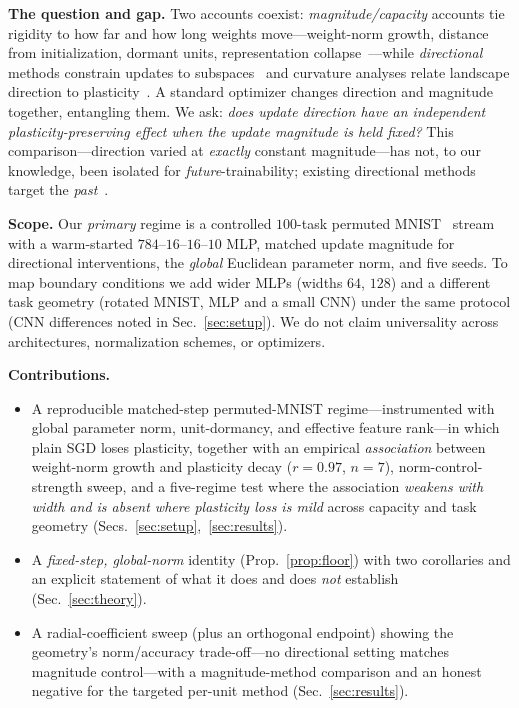 \documentclass[conference]{IEEEtran}
\begin{document}
\textbf{The question and gap.} Two accounts coexist: \emph{magnitude/capacity}
accounts tie rigidity to how far and how long weights move---weight-norm growth,
distance from initialization, dormant units, representation
collapse~\cite{ash2020,sokar2023,lyle2022,berariu2021,springer2025}---while
\emph{directional} methods constrain updates to
subspaces~\cite{lopezpaz2017,farajtabar2020,saha2021gpm,zeng2019owm,chaudhry2020orthog}
and curvature analyses relate landscape direction to
plasticity~\cite{lewandowski2023}. A standard optimizer changes direction and
magnitude together, entangling them. We ask: \emph{does update direction have an
independent plasticity-preserving effect when the update magnitude is held
fixed?} This comparison---direction varied at \emph{exactly} constant
magnitude---has not, to our knowledge, been isolated for \emph{future}-trainability;
existing directional methods target the \emph{past}~\cite{farajtabar2020,saha2021gpm}.

\textbf{Scope.} Our \emph{primary} regime is a controlled $100$-task permuted
MNIST~\cite{lecun1998} stream with a warm-started $784$--$16$--$16$--$10$ MLP,
matched update magnitude for directional interventions, the \emph{global}
Euclidean parameter norm, and five seeds. To map boundary conditions we add wider
MLPs (widths $64$, $128$) and a different task geometry (rotated MNIST, MLP and a
small CNN) {under the same protocol (CNN differences noted in Sec.~\ref{sec:setup})}. We do not claim
universality across architectures, normalization schemes, or optimizers.

\noindent\textbf{Contributions.}
\begin{itemize}
\item A reproducible matched-step permuted-MNIST regime---instrumented with global
parameter norm, unit-dormancy, and effective feature rank---in which plain SGD
loses plasticity, together with an empirical \emph{association} between
weight-norm growth and plasticity decay ($r{=}0.97$, $n{=}7$),
norm-control-strength sweep, and a five-regime test where the association
\emph{weakens with width and {is absent where plasticity loss is mild}} across
capacity and task geometry
(Secs.~\ref{sec:setup},~\ref{sec:results}).
\item A \emph{fixed-step, global-norm} {identity} (Prop.~\ref{prop:floor}) with two
corollaries and an explicit statement of what it does and does \emph{not}
establish
(Sec.~\ref{sec:theory}).
\item A radial-coefficient sweep (plus an orthogonal endpoint) showing the
geometry's norm/accuracy trade-off---no directional setting matches magnitude
control---with a magnitude-method comparison and an honest negative for the
targeted per-unit method
 (Sec.~\ref{sec:results}).
\end{itemize}
\end{document}
